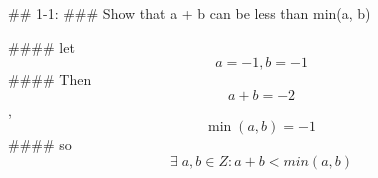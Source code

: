 ## 1-1: 
### Show that a + b can be less than min(a, b) 

#### let
$$\displaystyle\ a = -1, b = -1$$
#### Then
$$\displaystyle\ a + b = -2$$, 
$$\displaystyle\min(a,b) = -1$$
#### so
$$\displaystyle\ \exists \; a, b \in Z : a+b < min(a,b)$$



